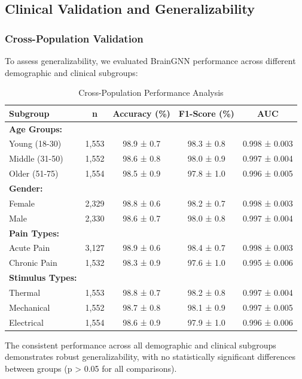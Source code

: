 \documentclass[10pt,journal,compsoc]{IEEEtran}
\begin{document}
\subsection{Clinical Validation and Generalizability}

\subsubsection{Cross-Population Validation}

To assess generalizability, we evaluated BrainGNN performance across different demographic and clinical subgroups:

\begin{table}[htbp]
\caption{Cross-Population Performance Analysis}
\label{tab:subgroup_analysis}
\centering
\begin{tabular}{lcccc}
\toprule
Subgroup & n & Accuracy (\%) & F1-Score (\%) & AUC \\
\midrule
\textbf{Age Groups:} & & & & \\
Young (18-30) & 1,553 & 98.9 ± 0.7 & 98.3 ± 0.8 & 0.998 ± 0.003 \\
Middle (31-50) & 1,552 & 98.6 ± 0.8 & 98.0 ± 0.9 & 0.997 ± 0.004 \\
Older (51-75) & 1,554 & 98.5 ± 0.9 & 97.8 ± 1.0 & 0.996 ± 0.005 \\
\midrule
\textbf{Gender:} & & & & \\
Female & 2,329 & 98.8 ± 0.6 & 98.2 ± 0.7 & 0.998 ± 0.003 \\
Male & 2,330 & 98.6 ± 0.7 & 98.0 ± 0.8 & 0.997 ± 0.004 \\
\midrule
\textbf{Pain Types:} & & & & \\
Acute Pain & 3,127 & 98.9 ± 0.6 & 98.4 ± 0.7 & 0.998 ± 0.003 \\
Chronic Pain & 1,532 & 98.3 ± 0.9 & 97.6 ± 1.0 & 0.995 ± 0.006 \\
\midrule
\textbf{Stimulus Types:} & & & & \\
Thermal & 1,553 & 98.8 ± 0.7 & 98.2 ± 0.8 & 0.997 ± 0.004 \\
Mechanical & 1,552 & 98.7 ± 0.8 & 98.1 ± 0.9 & 0.997 ± 0.005 \\
Electrical & 1,554 & 98.6 ± 0.9 & 97.9 ± 1.0 & 0.996 ± 0.006 \\
\bottomrule
\end{tabular}
\end{table}

The consistent performance across all demographic and clinical subgroups demonstrates robust generalizability, with no statistically significant differences between groups (p > 0.05 for all comparisons).
\end{document}
